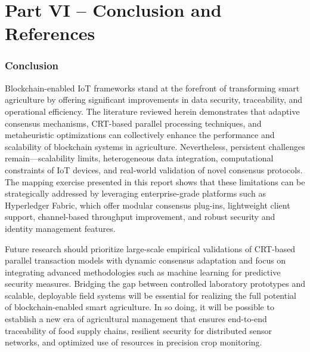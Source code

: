 \documentclass[12pt,onecolumn]{IEEEtran} %
\begin{document}
\part*{Part VI – Conclusion and References}

\section{Conclusion}\label{sec:conclusion}
Blockchain-enabled IoT frameworks stand at the forefront of transforming smart agriculture by offering significant improvements in data security, traceability, and operational efficiency. The literature reviewed herein demonstrates that adaptive consensus mechanisms, CRT-based parallel processing techniques, and metaheuristic optimizations can collectively enhance the performance and scalability of blockchain systems in agriculture. Nevertheless, persistent challenges remain—scalability limits, heterogeneous data integration, computational constraints of IoT devices, and real-world validation of novel consensus protocols. The mapping exercise presented in this report shows that these limitations can be strategically addressed by leveraging enterprise-grade platforms such as Hyperledger Fabric, which offer modular consensus plug-ins, lightweight client support, channel-based throughput improvement, and robust security and identity management features.

Future research should prioritize large-scale empirical validations of CRT-based parallel transaction models with dynamic consensus adaptation and focus on integrating advanced methodologies such as machine learning for predictive security measures. Bridging the gap between controlled laboratory prototypes and scalable, deployable field systems will be essential for realizing the full potential of blockchain-enabled smart agriculture. In so doing, it will be possible to establish a new era of agricultural management that ensures end-to-end traceability of food supply chains, resilient security for distributed sensor networks, and optimized use of resources in precision crop monitoring.
\end{document}
